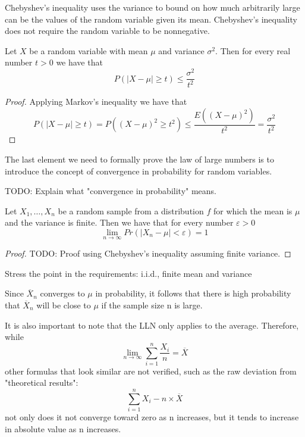 Chebyshev's inequality uses the variance to bound on how much arbitrarily large can be the values of the random variable given its mean. Chebyshev's inequality does not require the random variable to be nonnegative.

\begin{corollary}
 Let $X$ be a random variable with mean $\mu$ and variance $\sigma^2$. Then for every real number $t > 0$ we have that
\[
P \left( \left| X - \mu \right| \geq t \right) \leq \frac{\sigma^2}{t^2}
\]
\end{corollary}
\begin{proof}
Applying Markov's inequality we have that
\[
P \left( \left| X - \mu \right| \geq t \right) = P \left( \left( X - \mu \right)^2 \geq t^2 \right) \leq \frac{E \left( \left( X - \mu \right)^2 \right)}{t^2} = \frac{\sigma^2}{t^2}
\]
\end{proof}

The last element we need to formally prove the law of large numbers is to introduce the concept of convergence in probability for random variables.

{\color{red} TODO: Explain what "convergence in probability" means.}

\begin{theorem}
Let $X_1, \ldots, X_n$ be a random sample from a distribution $f$ for which the mean is $\mu$ and the variance is finite. Then we have that for every number $\varepsilon>0$
\[
 \lim_{n \rightarrow \infty} Pr \left( \left| X_{n} - \mu \right| < \varepsilon \right) = 1
\]
\end{theorem}
\begin{proof}
{\color{red} TODO: Proof using Chebyshev's inequality assuming finite variance.}
\end{proof}

{\color{red} Stress the point in the requirements: i.i.d., finite mean and variance}

{\color{red} Since $\overline{X}_{n}$ converges to $\mu$ in probability, it follows that there is high probability that $\overline{X}_{n}$ will be close to $\mu$ if the sample size n is large.}

 {\color{red} It is also important to note that the LLN only applies to the average. Therefore, while
\[
\lim_{n \to \infty} \sum_{i=1}^{n} \frac {X_{i}}{n} = \overline {X}
\]
other formulas that look similar are not verified, such as the raw deviation from "theoretical results":
\[
\sum_{i=1}^{n} X_{i} - n \times \overline {X}
\]
not only does it not converge toward zero as n increases, but it tends to increase in absolute value as n increases.}

